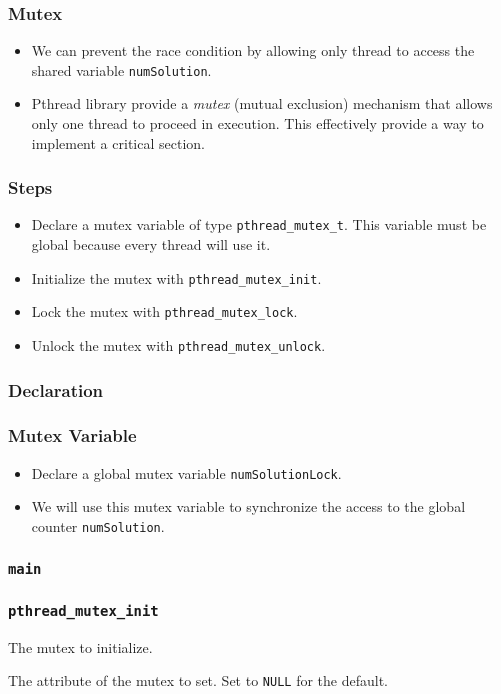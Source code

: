 \documentclass{beamer}
\begin{document}
\begin{frame}
\frametitle{Mutex}
\begin{itemize}
\item We can prevent the race condition by allowing only thread to
  access the shared variable {\tt numSolution}.
\item Pthread library provide a {\em mutex} (mutual exclusion)
  mechanism that allows only one thread to proceed in execution.  This
  effectively provide a way to implement a critical section.
\end{itemize}
\end{frame}

\begin{frame}
\frametitle{Steps}
\begin{itemize}
\item Declare a mutex variable of type {\tt pthread\_mutex\_t}.  This
  variable must be global because every thread will use it.
\item Initialize the mutex with {\tt pthread\_mutex\_init}.
\item Lock the mutex with {\tt pthread\_mutex\_lock}.
\item Unlock the mutex with {\tt pthread\_mutex\_unlock}.
\end{itemize}
\end{frame}

\begin{frame}
\frametitle{Declaration}
\end{frame}

\begin{frame}
\frametitle{Mutex Variable}
\begin{itemize}
\item Declare a global mutex variable {\tt numSolutionLock}.
\item We will use this mutex variable to synchronize the access to the
  global counter {\tt numSolution}.
\end{itemize}
\end{frame}

\begin{frame}
\frametitle{\tt main}
\end{frame}

\begin{frame}
\frametitle{\tt pthread\_mutex\_init}
\begin{description}[l]
\item[\tt mutex] The mutex to initialize.
\item[\tt attr] The attribute of the mutex to set.  Set to {\tt NULL}
  for the default.
\end{description}
\end{frame}
\end{document}
